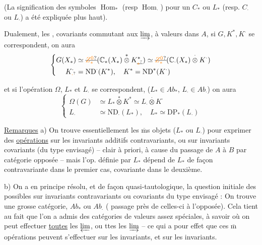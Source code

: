 (La signification des symboles $\operatorname{Hom}_{\ast}$ (resp $\operatorname{Hom}_{\cdot}$)
pour  un $C_{\ast}$ ou $L_{\ast}$  (resp. $C_{\cdot}$ ou $L_{\cdot}$)
a été expliquée plus haut).

Dualement,  les   , covariants
commutant aux $\varinjlim$, à valeurs dans
$A$, si $G,K^{\ast},K^{\cdot}$ se correspondent,
on aura
\[
\left\{\begin{aligned}
G(X_{\ast})&\simeq\deleted{\unsure{Z^{0}_{\ast}}}(\mathbb C_{\ast}(X_{\ast})\overset{\ast}{\otimes}K_{\deleted{\unsure{\ast}}}^{\ast})
\simeq\deleted{\unsure{Z^{0}_{\ast}}}(\mathbb C_{\cdot}(X_{\ast})\overset{\cdot}{\otimes}K^{\cdot})\\
K_{\unsure{\cdot}}^{\cdot}&=\mathrm{ND}^{\cdot}(K^{\ast}),\quad K^{\ast}=\mathrm{ND}^{\ast}(K^{\cdot})
\end{aligned}\right.
\]

et si l'opération $\Omega$, $L_{\ast}$ et $L_{\cdot}$ se
correspondent, ($L_{\ast}\in\mathit{Ab}_{\ast}$, $L_{\cdot}\in\mathit{Ab}_{\cdot}$)
on aura
\[
\left\{\begin{aligned}
\Omega(G)&\simeq L_{\ast}\overset{\ast}{\otimes}K^{\ast}
\simeq L_{\cdot}\overset{\cdot}{\otimes}K^{\cdot}\\
L_{\cdot}&\simeq\mathrm{ND}_{\cdot}(L_{\ast}),\quad L_{\ast}\simeq\mathrm{DP}_{\ast}(L_{\cdot})
\end{aligned}\right.
\]


\uline{Remarques} a) On trouve essentiellement
les $\overline{\mathrm{m}}$s objets ($L_{\ast}$ ou $L_{\cdot}$) pour exprimer
des \uline{opérations} sur les invariants additifs
contravariants, ou sur invariants  covariants
(du type envisagé) -- 
clair à priori, à cause du passage
de $A$ à $B$ par  catégorie opposée
-- mais l'op. définie par $L_{\ast}$ dépend
de $L_{\ast}$ de façon contravariante dans le
premier cas, covariante dans le deuxième.

b) On a en principe résolu, et de façon
quasi-tautologique, la question initiale
des   possibles sur
invariants contravariants ou covariants
 du type envisagé : On trouve une
 grosse catégorie, $\mathit{Ab}_{\ast}$ ou $\mathit{Ab}_{\cdot}$ (
passage près de celles-ci à l'opposée). Cela
tient au fait que l'on a admis
des catégories  de valeurs  assez spéciales,
à savoir où on peut effectuer \uline{toutes}
les $\varprojlim$, ou ttes les $\varinjlim$ -- ce
qui a pour effet que ces $\overline{\mathrm m}$ opérations
peuvent s'effectuer sur les 
 invariants, et  sur les invariants.

